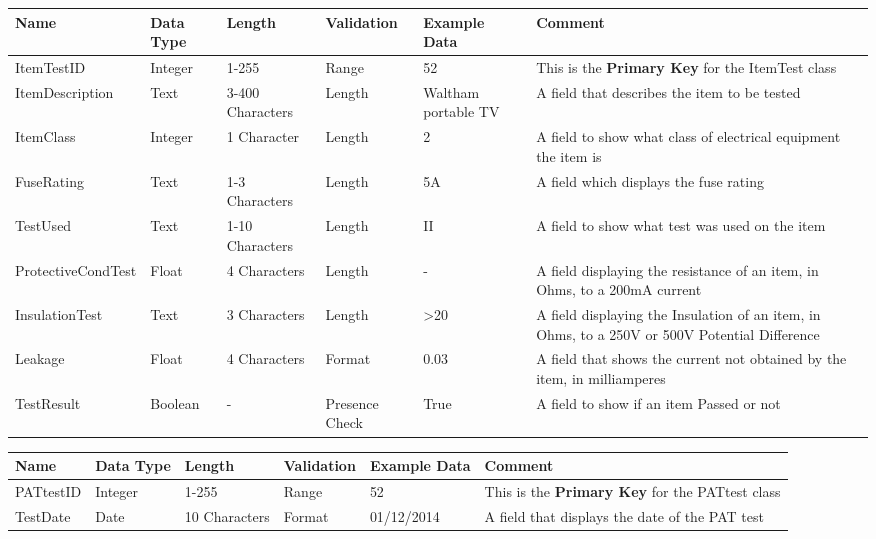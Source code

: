 \begin{landscape}
    \begin{center}
        \begin{tabular}{|p{3.4cm}|p{2cm}|p{2cm}|p{2cm}|p{4cm}|p{5cm}|}
            \hline
            \textbf{Name} & \textbf{Data Type} & \textbf{Length} & \textbf{Validation} & \textbf{Example Data} & \textbf{Comment} \\ \hline
            ItemTestID & Integer & 1-255 & Range & 52 & This is the \textbf{Primary Key} for the ItemTest class \\ \hline
            ItemDescription & Text & 3-400 Characters & Length & Waltham portable TV & A field that describes the item to be tested \\ \hline
            ItemClass & Integer & 1 Character & Length & 2 & A field to show what class of electrical equipment the item is \\ \hline
            FuseRating & Text & 1-3 Characters & Length & 5A & A field which displays the fuse rating \\ \hline
            TestUsed & Text & 1-10 Characters & Length & II & A field to show what test was used on the item \\ \hline
            ProtectiveCondTest & Float & 4 Characters & Length & - & A field displaying the resistance of an item, in Ohms, to a 200mA current  \\ \hline
            InsulationTest & Text & 3 Characters & Length & >20 & A field displaying the Insulation of an item, in Ohms, to a 250V or 500V Potential Difference \\ \hline
            Leakage & Float & 4 Characters & Format & 0.03 & A field that shows the current not obtained by the item, in milliamperes \\ \hline
            TestResult & Boolean & - & Presence Check & True & A field to show if an item Passed or not\\ \hline
        \end{tabular}
    \end{center}
\end{landscape}

\begin{landscape}
    \begin{center}
        \begin{tabular}{|p{2.3cm}|p{2cm}|p{3cm}|p{2cm}|p{4.6cm}|p{4cm}|}
            \hline
            \textbf{Name} & \textbf{Data Type} & \textbf{Length} & \textbf{Validation} & \textbf{Example Data} & \textbf{Comment} \\ \hline
            PATtestID & Integer & 1-255 & Range & 52 & This is the \textbf{Primary Key} for the PATtest class \\ \hline
            TestDate & Date & 10 Characters & Format & 01/12/2014 & A field that displays the date of the PAT test \\ \hline
        \end{tabular}
    \end{center}
\end{landscape}



